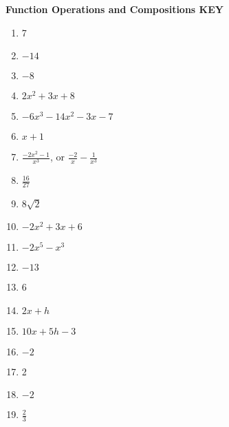 \documentclass[11pt]{article}
\begin{document}
\newpage


\textbf{Function Operations and Compositions KEY}

\begin{enumerate}
    \item 7
    \item $-14$
    \item $-8$
    \item $2x^2+3x+8$
    \item $-6x^3-14x^2-3x-7$
    \item $x+1$
    \item $\frac{-2x^2-1}{x^3}$, or $\frac{-2}{x}-\frac{1}{x^3}$
    \item $\frac{16}{27}$
    \item $8\sqrt{2}$
    \item $-2x^2+3x+6$
    \item $-2x^5-x^3$
    \item $-13$
    \item 6
    \item $2x+h$
    \item $10x + 5h - 3$
    \item $-2$
    \item 2
    \item $-2$
    \item $\frac{2}{3}$
\end{enumerate}
\end{document}
